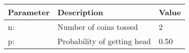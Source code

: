 \begin{tabular}{|l|l|l|}\hline
\textbf{Parameter } & \textbf{Description} & \textbf{Value} \\
\hline
n:	&Number of coins tossed& 2\\\hline
p:	&Probability of getting head& 0.50\\\hline
\end{tabular}
